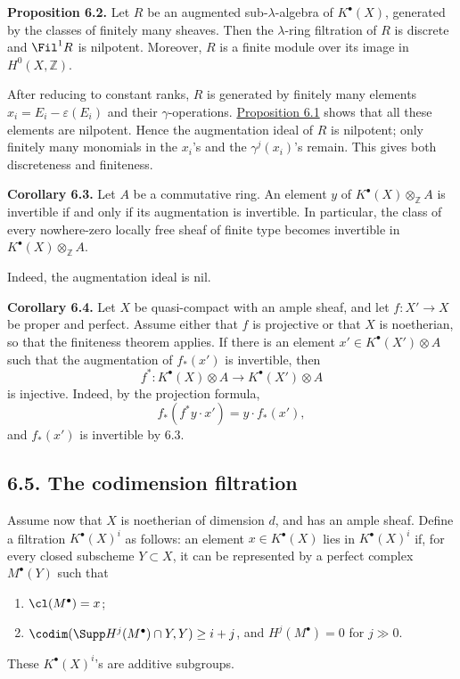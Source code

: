 \textbf{Proposition 6.2.} Let \(R\) be an augmented sub-\(\lambda\)-algebra of \(K^\bullet(X)\), generated by the classes of finitely many sheaves. Then the \(\lambda\)-ring filtration of \(R\) is discrete and \(\Fil^1R\) is nilpotent. Moreover, \(R\) is a finite module over its image in \(H^0(X,\mathbb Z)\).

After reducing to constant ranks, \(R\) is generated by finitely many elements \(x_i=E_i-\varepsilon(E_i)\) and their \(\gamma\)-operations. \hyperlink{sga6.e06.prop.6-1}{Proposition 6.1} shows that all these elements are nilpotent. Hence the augmentation ideal of \(R\) is nilpotent; only finitely many monomials in the \(x_i\)'s and the \(\gamma^j(x_i)\)'s remain. This gives both discreteness and finiteness.

\textbf{Corollary 6.3.} Let \(A\) be a commutative ring. An element \(y\) of \(K^\bullet(X)\otimes_{\mathbb Z}A\) is invertible if and only if its augmentation is invertible. In particular, the class of every nowhere-zero locally free sheaf of finite type becomes invertible in \(K^\bullet(X)\otimes_{\mathbb Z}A\).

Indeed, the augmentation ideal is nil.

\textbf{Corollary 6.4.} Let \(X\) be quasi-compact with an ample sheaf, and let \(f:X'\to X\) be proper and perfect. Assume either that \(f\) is projective or that \(X\) is noetherian, so that the finiteness theorem applies. If there is an element \(x'\in K^\bullet(X')\otimes A\) such that the augmentation of \(f_*(x')\) is invertible, then
\[
  f^*:K^\bullet(X)\otimes A\longrightarrow K^\bullet(X')\otimes A
\]
is injective.
Indeed, by the projection formula,
\[
  f_*(f^*y\cdot x')=y\cdot f_*(x'),
\]
and \(f_*(x')\) is invertible by 6.3.

\subsection*{6.5. The codimension filtration}
Assume now that \(X\) is noetherian of dimension \(d\), and has an ample sheaf. Define a filtration \(K^\bullet(X)^i\) as follows: an element \(x\in K^\bullet(X)\) lies in \(K^\bullet(X)^i\) if, for every closed subscheme \(Y\subset X\), it can be represented by a perfect complex \(M^\bullet(Y)\) such that
\begin{enumerate}[label=\textup{\alph*)}]
\item \(\cl(M^\bullet)=x\);
\item \(\codim(\Supp H^j(M^\bullet)\cap Y,Y)\geq i+j\), and \(H^j(M^\bullet)=0\) for \(j\gg 0\).
\end{enumerate}
These \(K^\bullet(X)^i\)'s are additive subgroups.

